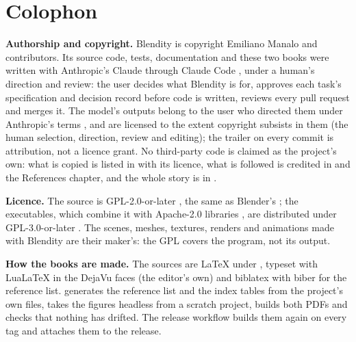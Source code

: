 \chapter*{Colophon}
\textbf{Authorship and copyright.} Blendity is copyright Emiliano Manalo and contributors. Its source code, tests,
documentation and these two books were written with Anthropic's Claude through Claude Code \cite{ClaudeCode2026}, under
a human's direction and review: the user decides what Blendity is for, approves each task's specification and decision
record before code is written, reviews every pull request and merges it. The model's outputs belong to the user who
directed them under Anthropic's terms \cite{AnthropicTerms2026}, and are licensed to the extent copyright subsists in
them (the human selection, direction, review and editing); the  trailer on every commit is
attribution, not a licence grant. No third-party code is claimed as the project's own: what is copied is listed in
 with its licence, what is followed is credited in  and the References
chapter, and the whole story is in .

\textbf{Licence.} The source is GPL-2.0-or-later \cite{GPLv2}, the same as Blender's \cite{Blender2026}; the
executables, which combine it with Apache-2.0 libraries \cite{Apache2}, are distributed under GPL-3.0-or-later
\cite{GPLv3}. The scenes, meshes, textures, renders and animations made with Blendity are their maker's: the GPL covers
the program, not its output.

\textbf{How the books are made.} The sources are LaTeX under , typeset with LuaLaTeX in the DejaVu
faces (the editor's own) and biblatex with biber for the reference list.  generates the
reference list and the index tables from the project's own files, takes the figures headless from a scratch project,
builds both PDFs and checks that nothing has drifted. The release workflow builds them again on every tag and attaches
them to the release.

